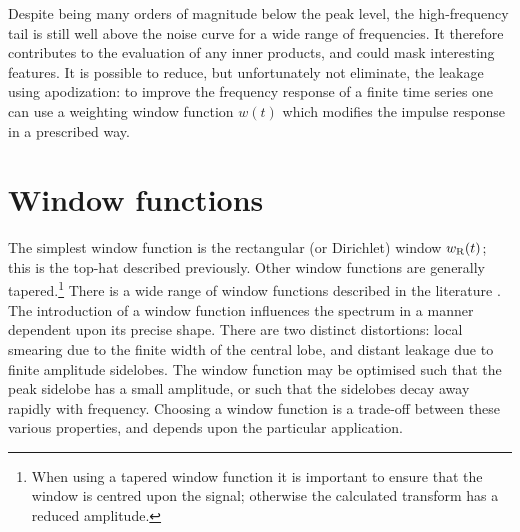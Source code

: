 Despite being many orders of magnitude below the peak level, the high-frequency tail is still well above the noise curve for a wide range of frequencies. It therefore contributes to the evaluation of any inner products, and could mask interesting features. It is possible to reduce, but unfortunately not eliminate, the leakage using apodization: to improve the frequency response of a finite time series one can use a weighting window function $w(t)$ which modifies the impulse response in a prescribed way.

\section{Window functions}

The simplest window function is the rectangular (or Dirichlet) window $w_\mathrm{R}(t)$; this is the top-hat described previously. Other window functions are generally tapered.\footnote{When using a tapered window function it is important to ensure that the window is centred upon the signal; otherwise the calculated transform has a reduced amplitude.} There is a wide range of window functions described in the literature \citep{Harris1978,Kaiser1980,Nuttall1981,McKechan2010}. The introduction of a window function influences the spectrum in a manner dependent upon its precise shape. There are two distinct distortions: local smearing due to the finite width of the central lobe, and distant leakage due to finite amplitude sidelobes. The window function may be optimised such that the peak sidelobe has a small amplitude, or such that the sidelobes decay away rapidly with frequency. Choosing a window function is a trade-off between these various properties, and depends upon the particular application.

